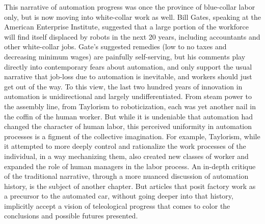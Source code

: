 This narrative of automation progress was once the province of
blue-collar labor only, but is now moving into white-collar work as
well. Bill Gates, speaking at the American Enterprise Institute,
suggested that a large portion of the workforce will find itself
displaced by robots in the next 20 years, including accountants and
other white-collar
jobs.\cite{???-http://bgr.com/2014/03/14/bill-gates-interview-robots/}
Gate's suggested remedies (low to no taxes and decreasing minimum
wages) are painfully self-serving, but his comments play directly into
contemporary fears about automation, and only support the usual
narrative that job-loss due to automation is inevitable, and workers
should just get out of the way. To this view, the last two hundred
years of innovation in automation is unidirectional and largely
undifferentiated. From steam power to the assembly line, from
Taylorism to roboticization, each was yet another nail in the coffin
of the human worker. But while it is undeniable that automation had changed the
character of human labor, this perceived uniformity in automation
processes is a figment of the collective imagination. For example,
Taylorism, while it attempted to more deeply control and rationalize
the work processes of the individual, in a way mechanizing them, also
created new classes of worker and expanded the role of human managers
in the labor process. An in-depth critique of the traditional
narrative, through a more nuanced discussion of automation
history, is the subject of another chapter. But 
articles that posit factory work as a precursor to the automated
car, without going deeper into that history, implicitly accept a
vision of teleological progress that comes to color the conclusions
and possible futures presented.


